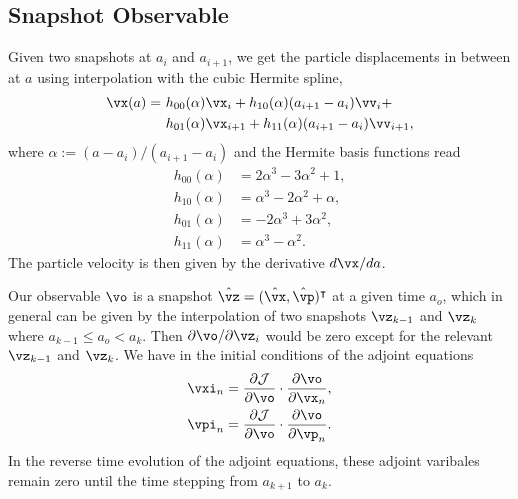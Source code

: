 \documentclass[usenatbib]{mnras}
\renewcommand{\d}{d}
\newcommand{\p}{\partial}
\newcommand{\cJ}{\mathcal{J}}
\newcommand{\half}{\nicefrac12}
\begin{document}


\subsection{Snapshot Observable}
\label{sec:snapobs}

Given two snapshots at $a_i$ and $a_{i+1}$, we get the particle displacements
in between at $a$ using interpolation with the cubic Hermite spline,
\begin{align}
  \vx(a) =\ &h_{00}(\alpha)\vx_i + h_{10}(\alpha)(a_{i+1} - a_i)\vv_i + \nonumber\\
           &h_{01}(\alpha)\vx_{i+1} + h_{11}(\alpha)(a_{i+1} - a_i)\vv_{i+1},
\end{align}
where $\alpha := (a - a_i)/(a_{i+1} - a_i)$ and the Hermite basis functions read
\begin{align}
  h_{00}(\alpha) &= 2\alpha^3 - 3\alpha^2 + 1, \nonumber\\
  h_{10}(\alpha) &= \alpha^3 - 2\alpha^2 + \alpha, \nonumber\\
  h_{01}(\alpha) &= -2\alpha^3 + 3\alpha^2, \nonumber\\
  h_{11}(\alpha) &= \alpha^3 - \alpha^2.
\end{align}
The particle velocity is then given by the derivative $\d\vx / \d a$.

Our observable $\vo$ is a snapshot $\hat\vz = (\hat\vx, \hat\vp)^\intercal$ at a
given time $a_o$, which in general can be given by the interpolation of two
snapshots $\vz_{k-1}$ and $\vz_k$ where $a_{k-1} \leq a_o < a_k$.
Then ${\p\vo}/{\p\vz_i}$ would be zero except for the relevant $\vz_{k-1}$ and
$\vz_k$.
We have in the initial conditions of the adjoint equations
\begin{align}
  \vxi_n &= \frac{\p\cJ}{\p\vo} \cdot \frac{\p\vo}{\p\vx_n}, \nonumber\\
  \vpi_n &= \frac{\p\cJ}{\p\vo} \cdot \frac{\p\vo}{\p\vp_n}.
\end{align}
In the reverse time evolution of the adjoint equations, these adjoint varibales
remain zero until the time stepping from $a_{k+1}$ to $a_k$.
\end{document}
